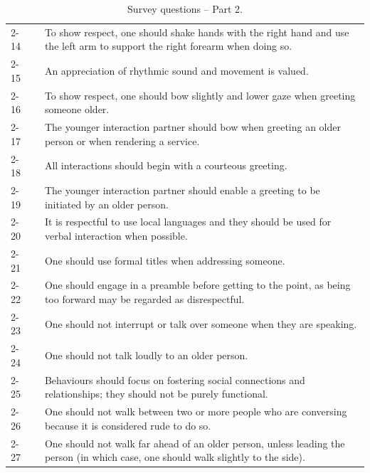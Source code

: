 \documentclass{CSSRforAfrica}
\begin{document}
\begin{table}[thb]
\begin{center}
\begin{tabularx}{\linewidth}{|l c|X|}
 {\small 2-14 }  & {\small} & {\small  To show respect, one should shake hands with the right hand and use the left arm to support the right forearm when doing so.}\\
 {\small 2-15}  & {\small} & {\small  An appreciation of rhythmic sound and movement is valued. }\\
 {\small 2-16 }  & {\small} & {\small  To show respect, one should bow slightly and lower gaze when greeting someone older.}\\
 {\small 2-17 }  & {\small} & {\small  The younger interaction partner should bow when greeting an older person or when rendering a service.}\\
 {\small 2-18 }  & {\small} & {\small  All interactions should begin with a courteous greeting.}\\
 {\small 2-19 }  & {\small} & {\small  The younger interaction partner should enable a greeting to be initiated by an older person.}\\
 {\small 2-20 }  & {\small } & {\small  It is respectful to use local languages and they should be used for verbal interaction when possible. }\\
 {\small 2-21 }  & {\small } & {\small  One should use formal titles when addressing someone.}\\
 {\small 2-22 }  & {\small } & {\small  One should engage in a preamble before getting to the point, as being too forward may be regarded as disrespectful.}\\
 {\small 2-23 }  & {\small} & {\small  One should not interrupt or talk over someone when they are speaking. }\\
 {\small 2-24 }  & {\small} & {\small  One should not talk loudly to an older person.}\\
 {\small 2-25}  & {\small } & {\small  Behaviours should focus on fostering social connections and relationships; they should not be purely functional.}\\ 
 {\small 2-26 }  & {\small} & {\small  One should not walk between two or more people who are conversing because it is considered rude to do so.}\\
 {\small 2-27}  & {\small} & {\small  One should not walk far ahead of an older person, unless leading the person (in which case, one should walk slightly to the side). }\\
\hline \hline
\end{tabularx}
\end{center}
\caption{Survey questions -- Part 2. }
\label{table:questions2}
\end{table}
\end{document}
